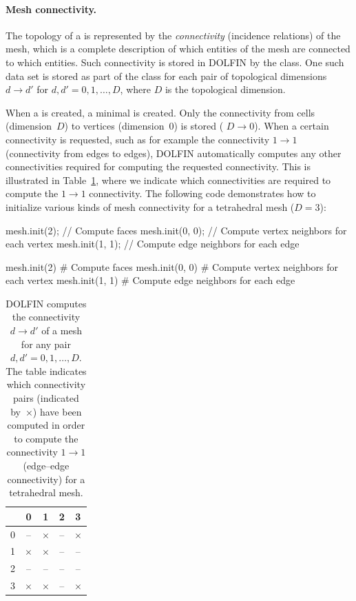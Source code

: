 \paragraph{Mesh connectivity.}

The topology of a  is represented by the \emph{connectivity}
(incidence relations) of the mesh, which is a complete description of
which entities of the mesh are connected to which entities. Such
connectivity is stored in DOLFIN by the 
class. One such data set is stored as part of the class
 for each pair of topological dimensions $d
\rightarrow d'$ for $d, d' = 0, 1, \ldots, D$, where $D$ is the
topological dimension.

When a  is created, a minimal  is created.
Only the connectivity from cells (dimension~$D$) to vertices
(dimension~$0$) is stored ( $D \rightarrow 0$).
When a certain connectivity is requested, such as for example the connectivity
$1 \rightarrow 1$ (connectivity from edges to edges), DOLFIN automatically
computes any other connectivities required for computing the requested
connectivity. This is illustrated in Table~\ref{tab:logg-2:connectivity},
where we indicate which connectivities are required to compute the $1
\rightarrow 1$ connectivity.  The following code demonstrates how to
initialize various kinds of mesh connectivity for a tetrahedral mesh
($D = 3$):
\begin{c++}
mesh.init(2);    // Compute faces
mesh.init(0, 0); // Compute vertex neighbors for each vertex
mesh.init(1, 1); // Compute edge neighbors for each edge
\end{c++}
\begin{python}
mesh.init(2)      # Compute faces
mesh.init(0, 0)   # Compute vertex neighbors for each vertex
mesh.init(1, 1)   # Compute edge neighbors for each edge
\end{python}

\begin{table}
  \centering
  \begin{tabular}{c|cccc}
    & 0 & 1 & 2 & 3 \\
    \midrule
    0 & -- & $\times$ & -- & $\times$ \\
    1 & $\times$ & $\times$ & -- & -- \\
    2 & -- & -- & -- & -- \\
    3 & $\times$ & $\times$ & -- & $\times$ \\
  \end{tabular}
  \caption{DOLFIN computes the connectivity $d \rightarrow d'$ of a
    mesh for any pair $d, d' = 0, 1, \ldots, D$. The table
    indicates which connectivity pairs (indicated by~$\times$) have
    been computed in order to compute the connectivity $1 \rightarrow
    1$ (edge--edge connectivity) for a tetrahedral mesh.}
  \label{tab:logg-2:connectivity}
\end{table}

